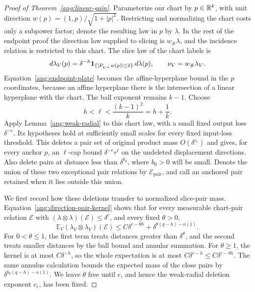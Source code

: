 \begin{proof}[Proof of Theorem~\ref{ang:linear-gain}]
Parameterize our chart by $p\in\mathbb R^k$, with unit direction
$w(p)=(1,p)/\sqrt{1+|p|^2}$. Restricting and normalizing the chart
costs only a subpower factor; denote the resulting law in $p$ by
$\lambda$. In the rest of the endpoint proof the direction law supplied
to slicing is $w_\#\lambda$, and the incidence relation is restricted to
this chart. The slice law of the chart labels is
\[
 d\lambda_V(p)=\delta^{-h}
 \mathbf 1_{\{|P_{V^\perp}w(p)|\le\delta\}}\,d\lambda(p),
 \qquad \nu_V=w_\#\lambda_V.
\]
Equation~\eqref{ang:endpoint-plate}
becomes the affine-hyperplane bound in the $p$ coordinates, because
an affine hyperplane there is the intersection of a linear hyperplane
with the chart. The ball exponent remains $k-1$. Choose
\[
 h<\ell<\frac{(k-1)^2}{k}=h+\frac1k.
\]
Apply Lemma~\ref{ang:weak-radial} to this chart law, with a small
fixed output loss $\delta^{-e}$. Its hypotheses hold at sufficiently
small scales for every fixed input-loss threshold. This deletes a
pair set of original product mass $O(\delta^{c_e})$ and gives, for
every anchor $p$, an $\ell$-cap bound $\delta^{-e}r^\ell$ on
the undeleted displacement directions. Also delete pairs at distance
less than $\delta^{b_0}$, where $b_0>0$ will be small. Denote the union
of these two exceptional pair relations by $\mathcal E_{\mathrm{pair}}$,
and call an anchored pair retained when it lies outside this union.

We first record how these deletions transfer to normalized slice-pair
mass. Equation~\eqref{ang:direction-pair-kernel}
shows that for every measurable chart-pair relation $\mathcal E$ with
$(\lambda\otimes\lambda)(\mathcal E)\le\delta^c$, and every fixed
$\theta>0$,
\begin{equation}\label{ang:exceptional-pair-transfer}
 \mathbb E_V(\lambda_V\otimes\lambda_V)(\mathcal E)
 \le C\delta^{c-\theta h}
       +\delta^{\theta(q-h)-o(1)}.
\end{equation}
For $0<\theta\le1$, the first term treats distances greater than
$\delta^\theta$, and the second treats smaller distances by the ball
bound and annular summation. For $\theta\ge1$, the kernel is at most
$C\delta^{-h}$, so the whole expectation is at most
$C\delta^{c-h}\le C\delta^{c-\theta h}$. The same annulus calculation
bounds the expected mass of the close pairs by
$\delta^{b_0(q-h)-o(1)}$. We leave $\theta$ free until $e$, and hence
the weak-radial deletion exponent $c_e$, has been fixed.


\end{proof}
